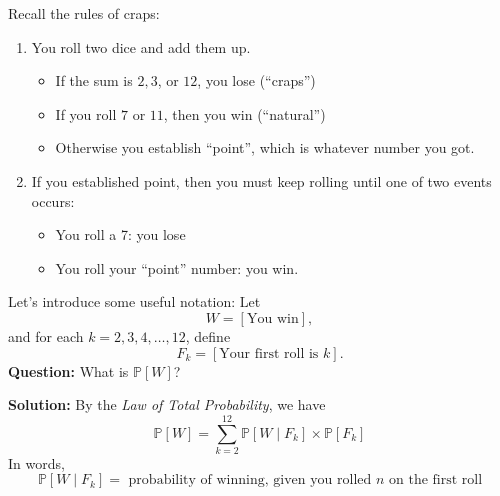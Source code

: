 \documentclass[10pt]{article}
\theoremstyle{definition}
\newcommand{\vt}{\vskip 5mm} %
\newcommand{\fl}{\noindent\textbf} %
\newcommand{\Fl}{\vt\noindent\textbf} %
\newcommand{\1}[1]{\textbf{1}_{\left[#1\right]}} %
\def\P{\mathbb{P}} %
\begin{document}
Recall the rules of craps:
\begin{enumerate} 
  \item You roll two dice and add them up.
  \begin{itemize}
    \item If the sum is $2,3$, or $12$, you lose (``craps'')
    \item If you roll $7$ or $11$, then you win  (``natural'')
    \item Otherwise you establish ``point'', which is whatever number you got.
  \end{itemize}
  \item If you established point, then you must keep rolling until one of two events occurs:
  \begin{itemize}
    \item You roll a 7: you lose
    \item You roll your ``point'' number: you win.
  \end{itemize}
\end{enumerate}

Let's introduce some useful notation:
Let
\begin{equation*}
  W= \left[ \text{You win} \right],
\end{equation*}
and for each $k=2,3,4,\ldots,12$, define
\begin{equation*}
  F_{k}= \left[ \text{Your first roll is }k \right].
\end{equation*}
\Fl{Question:} What is $\P\left[W \right]$?

\fl{Solution:} By the \textit{Law of Total Probability}, we have
\begin{equation}\label{eq:6}
  \P\left[W  \right] =  \sum_{k=2}^{12} \P\left[W\mid F_{k}\right]\times \P\left[F_{k} \right] 
\end{equation}
In words,
\begin{equation*}
  \P\left[W\mid F_{k}\right] = \text{ probability of winning, given you rolled $n$ on the first roll}
\end{equation*}
\end{document}
